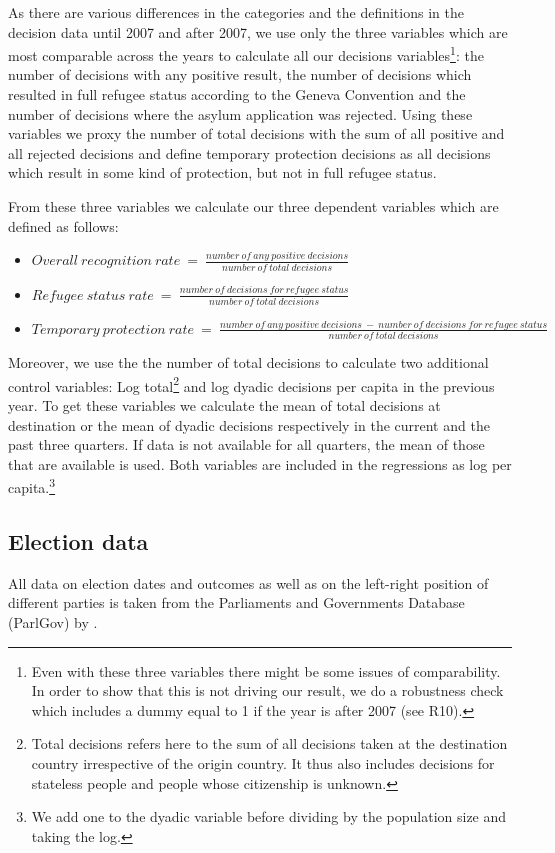 \documentclass[11pt,a4paper]{scrartcl}
\begin{document}
As there are various differences in the categories and the definitions in the decision data until 2007 and after 2007, we use only the three variables which are most comparable across the years to calculate all our decisions variables\footnote{Even with these three variables there might be some issues of comparability. In order to show that this is not driving our result, we do a robustness check which includes a dummy equal to 1 if the year is after 2007 (see R10).}: the number of decisions with any positive result, the number of decisions which resulted in full refugee status according to the Geneva Convention and the number of decisions where the asylum application was rejected. Using these variables we proxy the number of total decisions with the sum of all positive and all rejected decisions and define temporary protection decisions as all decisions which result in some kind of protection, but not in full refugee status.     

From these three variables we calculate our three dependent variables which are defined as follows:
\begin{itemize}
	\item $Overall~recognition~rate~=~\frac{number~of~any~positive~decisions}{number~of~total~decisions}$ 
	\item  $Refugee~status~rate~=~\frac{number~of~decisions~for~refugee~status} {number~of~total~decisions}$ 
	\item $Temporary~protection~rate~=~ \frac{number~of~any~positive~decisions~ - ~number~of~decisions~for~refugee~status} {number~of~total~decisions}$ 
\end{itemize}

Moreover, we use the the number of total decisions to calculate two additional control variables: Log total\footnote{Total decisions refers here to the sum of all decisions taken at the destination country irrespective of the origin country. It thus also includes decisions for stateless people and people whose citizenship is unknown.} and log dyadic decisions per capita in the previous year. To get these variables we calculate the mean of total decisions at destination or the mean of dyadic decisions respectively in the current and the past three quarters. If data is not available for all quarters, the mean of those that are available is used. Both variables are included in the regressions as log per capita.\footnote{We add one to the dyadic variable before dividing by the population size and taking the log.} 

\subsection{Election data}
All data on election dates and outcomes as well as on the left-right position of different parties is taken from the Parliaments and Governments Database (ParlGov) by \textcite{parlgov2016}.
\end{document}
